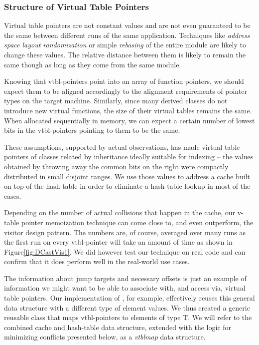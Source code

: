 \subsubsection{Structure of Virtual Table Pointers}
\label{sec:sovtp}

Virtual table pointers are not constant values and are not even guaranteed to be 
the same between different runs of the same application. Techniques like 
\emph{address space layout randomization} or simple \emph{rebasing} of the entire 
module are likely to change these values. The relative distance between them is 
likely to remain the same though as long as they come from the same module.

Knowing that vtbl-pointers point into an array of function pointers, we should 
expect them to be aligned accordingly to the alignment requirements of pointer 
types on the target machine. Similarly, since many derived classes do not 
introduce new virtual functions, the size of their virtual tables remains the 
same. When allocated sequentially in memory, we can expect a certain number of 
lowest bits in the vtbl-pointers pointing to them to be the same.

These assumptions, supported by actual observations, has made virtual table 
pointers of classes related by inheritance ideally suitable for indexing -- the 
values obtained by throwing away the common bits on the right were compactly 
distributed in small disjoint ranges. We use those values to address a cache 
built on top of the hash table in order to eliminate a hash table lookup in most 
of the cases.

Depending on the number of actual collisions that happen in the cache, our 
v-table pointer memoization technique can come close to, and even outperform, the 
visitor design pattern. The numbers are, of course, averaged over many runs as 
the first run on every vtbl-pointer will take an amount of time as shown in 
Figure\ref{fig:DCastVis1}. We did however test our technique on real code and 
can confirm that it does perform well in the real-world use cases.

The information about jump targets and necessary offsets is just an example of 
information we might want to be able to associate with, and access via, virtual 
table pointers. Our implementation of , for example, 
effectively reuses this general data structure with a different type of element 
values. We thus created a generic reusable class  that maps 
vtbl-pointers to elements of type T. We will refer to the combined cache and 
hash-table data structure, extended with the logic for minimizing conflicts 
presented below, as a \emph{vtblmap} data structure.

